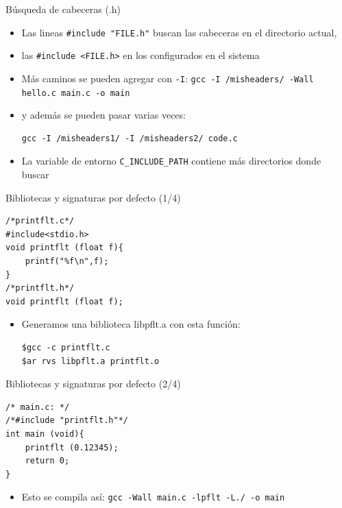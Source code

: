 \documentclass[xetex]{beamer}
\begin{document}
\begin{frame}[fragile]{Búsqueda de cabeceras (.h)}
\begin{itemize}
  \item Las lineas \verb=#include "FILE.h"= buscan las cabeceras en el directorio actual,
  \item las \verb=#include <FILE.h>= en los configurados en el sistema
  \item Más caminos se pueden agregar con \verb=-I=: \verb=gcc -I /misheaders/ -Wall hello.c main.c -o main=
  \item y además se pueden pasar varias veces: 
  \begin{verbatim}
gcc -I /misheaders1/ -I /misheaders2/ code.c
\end{verbatim}
    \item La variable de entorno \verb=C_INCLUDE_PATH= contiene más directorios donde buscar
\end{itemize}
\end{frame}

\begin{frame}[fragile]{Bibliotecas y signaturas por defecto (1/4)}

\begin{lstlisting}
/*printflt.c*/
#include<stdio.h>
void printflt (float f){
    printf("%f\n",f);
}
/*printflt.h*/
void printflt (float f);
\end{lstlisting}
\begin{itemize}

  \item Generamos una biblioteca libpflt.a con esta función:
\begin{verbatim}
$gcc -c printflt.c
$ar rvs libpflt.a printflt.o
\end{verbatim}
\end{itemize}
\end{frame}

\begin{frame}[fragile]{Bibliotecas y signaturas por defecto (2/4)}
  
\begin{lstlisting}
/* main.c: */
/*#include "printflt.h"*/
int main (void){
    printflt (0.12345);
    return 0;
}
\end{lstlisting}
\begin{itemize}
  \item Esto se compila así: \verb=gcc -Wall main.c -lpflt -L./ -o main=
\end{itemize}
\end{frame}
\end{document}
